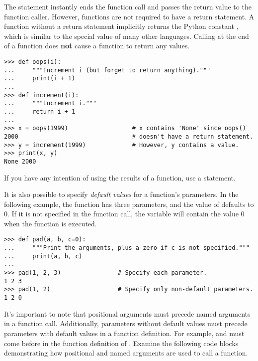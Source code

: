 \begin{warn} %
The  statement instantly ends the function call and passes the return value to the function caller.
However, functions are not required to have a return statement.
A function without a return statement implicitly returns the Python constant , which is similar to the special value  of many other languages.
Calling  at the end of a function does \textbf{not} cause a function to return any values.

\begin{lstlisting}
>>> def oops(i):
...     """Increment i (but forget to return anything)."""
...     print(i + 1)
...
>>> def increment(i):
...     """Increment i."""
...     return i + 1
...
>>> x = oops(1999)                  # x contains 'None' since oops()
2000                                # doesn't have a return statement.
>>> y = increment(1999)             # However, y contains a value.
>>> print(x, y)
None 2000
\end{lstlisting}
If you have any intention of using the results of a function, use a  statement.
\end{warn}

It is also possible to specify \emph{default values} for a function's parameters.
In the following example, the function  has three parameters, and the value of  defaults to 0.
If it is not specified in the function call, the variable  will contain the value 0 when the function is executed.

\begin{lstlisting}
>>> def pad(a, b, c=0):
...     """Print the arguments, plus a zero if c is not specified."""
...     print(a, b, c)
...
>>> pad(1, 2, 3)                # Specify each parameter.
1 2 3
>>> pad(1, 2)                   # Specify only non-default parameters.
1 2 0
\end{lstlisting}

It's important to note that positional arguments must precede named arguments in a function call. Additionally, parameters without default values must precede parameters with default values in a function definition.
For example,  and  must come before  in the function definition of .
Examine the following code blocks demonstrating how positional and named arguments are used to call a function.

